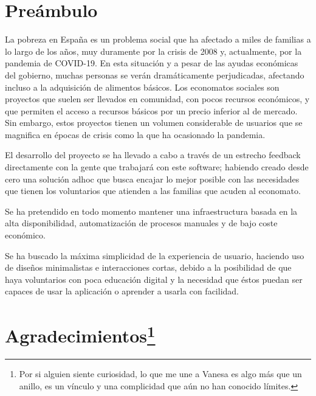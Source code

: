 
\chapter*{Preámbulo}
\thispagestyle{empty}
\par La pobreza en España es un problema social que ha afectado a miles de familias a lo largo de los años, muy duramente por la crisis de 2008 y, actualmente, por la pandemia de COVID-19.
En esta situación y a pesar de las ayudas económicas del gobierno, muchas personas se verán dramáticamente perjudicadas, afectando incluso a la adquisición de alimentos básicos.
Los economatos sociales son proyectos que suelen ser llevados en comunidad, con pocos recursos económicos, y que permiten el acceso a recursos básicos por un precio inferior al de mercado. Sin embargo, estos proyectos tienen un volumen considerable de usuarios que se magnifica en épocas de crisis como la que ha ocasionado la pandemia.
\vspace{1em}
\par El desarrollo del proyecto se ha llevado a cabo a través de un estrecho feedback directamente con la gente que trabajará con este software; habiendo creado desde cero una solución adhoc que busca encajar lo mejor posible con las necesidades que tienen los voluntarios que atienden a las familias que acuden al economato.
\vspace{1em}
\par Se ha pretendido en todo momento mantener una infraestructura basada en la alta disponibilidad, automatización de procesos manuales y de bajo coste económico.
\vspace{1em}
\par Se ha buscado la máxima simplicidad de la experiencia de usuario, haciendo uso de diseños minimalistas e interacciones cortas, debido a la posibilidad de que haya voluntarios con poca educación digital y la necesidad que éstos puedan ser capaces de usar la aplicación o aprender a usarla con facilidad.

\cleardoublepage %
\chapter*{Agradecimientos\footnote{Por si alguien siente curiosidad, lo que me une a Vanesa es algo más que un anillo, es un vínculo y una complicidad que aún no han conocido límites.}
}

